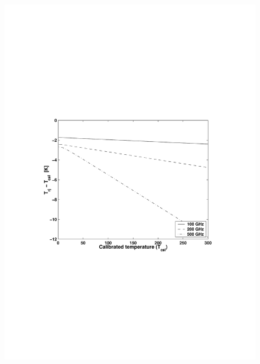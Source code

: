  \begin{figure}[t]
  \begin{center}
   \begin{minipage}{0.50\textwidth}
    \centering
    \includegraphics*[width=0.99\hsize]{Figs/fig_calerror_trj_1}
   \end{minipage}%
   \begin{minipage}{0.50\textwidth}
    \centering

\end{minipage}
\end{center}
\end{figure}
